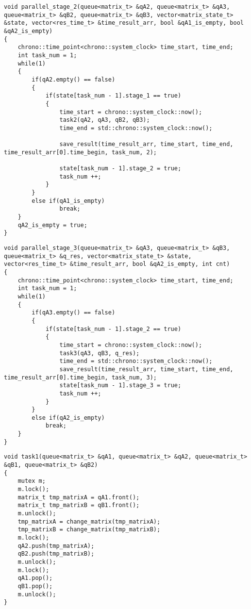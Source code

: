 \begin{lstlisting}[label=lst:parallel_stage_2,caption=Функция 2-ой ленты конвейерной обработки матрицы]
void parallel_stage_2(queue<matrix_t> &qA2, queue<matrix_t> &qA3, queue<matrix_t> &qB2, queue<matrix_t> &qB3, vector<matrix_state_t> &state, vector<res_time_t> &time_result_arr, bool &qA1_is_empty, bool &qA2_is_empty)
{
    chrono::time_point<chrono::system_clock> time_start, time_end;
    int task_num = 1;
    while(1)
    {
        if(qA2.empty() == false)
        {
            if(state[task_num - 1].stage_1 == true)
            {
                time_start = chrono::system_clock::now();
                task2(qA2, qA3, qB2, qB3);
                time_end = std::chrono::system_clock::now();

                save_result(time_result_arr, time_start, time_end, time_result_arr[0].time_begin, task_num, 2);

                state[task_num - 1].stage_2 = true;
                task_num ++;  
            }
        }
        else if(qA1_is_empty)
                break;
    }
    qA2_is_empty = true;
}
\end{lstlisting}

\begin{lstlisting}[label=lst:parallel_stage_3,caption=Функция 3-ей ленты конвейерной обработки матрицы]
void parallel_stage_3(queue<matrix_t> &qA3, queue<matrix_t> &qB3, queue<matrix_t> &q_res, vector<matrix_state_t> &state, vector<res_time_t> &time_result_arr, bool &qA2_is_empty, int cnt)
{
    chrono::time_point<chrono::system_clock> time_start, time_end;
    int task_num = 1;
    while(1)
    {
        if(qA3.empty() == false)
        {
            if(state[task_num - 1].stage_2 == true)
            {
                time_start = chrono::system_clock::now();
                task3(qA3, qB3, q_res);
                time_end = std::chrono::system_clock::now();
                save_result(time_result_arr, time_start, time_end, time_result_arr[0].time_begin, task_num, 3);
                state[task_num - 1].stage_3 = true;
                task_num ++;
            }
        }
        else if(qA2_is_empty)
            break;
    }
}
\end{lstlisting}

\begin{lstlisting}[label=lst:stage_1,caption=Функция реализации 1-ого этапа обработки матрицы]
void task1(queue<matrix_t> &qA1, queue<matrix_t> &qA2, queue<matrix_t> &qB1, queue<matrix_t> &qB2)
{
    mutex m;
    m.lock();
    matrix_t tmp_matrixA = qA1.front();
    matrix_t tmp_matrixB = qB1.front();
    m.unlock();
    tmp_matrixA = change_matrix(tmp_matrixA);
    tmp_matrixB = change_matrix(tmp_matrixB);
    m.lock();
    qA2.push(tmp_matrixA);
    qB2.push(tmp_matrixB);
    m.unlock();
    m.lock();
    qA1.pop();
    qB1.pop();
    m.unlock();
}
\end{lstlisting}

